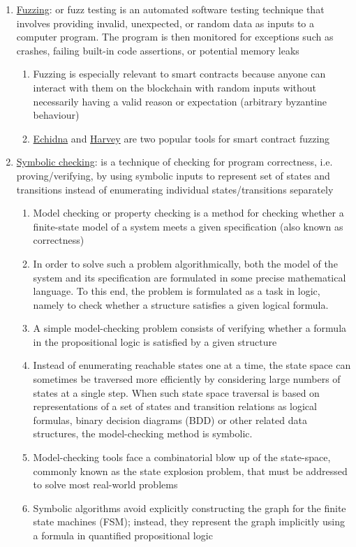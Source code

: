 \begin{enumerate}
\item\href{https://en.wikipedia.org/wiki/Fuzzing}{Fuzzing}: or fuzz testing is an automated software testing technique that involves providing invalid, unexpected, or random data as inputs to a computer program. The program is then monitored for exceptions such as crashes, failing built-in code assertions, or potential memory leaks
	\begin{enumerate}
	\item Fuzzing is especially relevant to smart contracts because anyone can interact with them on the blockchain with random inputs without necessarily having a valid reason or expectation (arbitrary byzantine behaviour)
	\item\href{https://github.com/crytic/echidna}{Echidna} and \href{https://mariachris.github.io/Pubs/FSE-2020-Harvey.pdf}{Harvey} are two popular tools for smart contract fuzzing
	\end{enumerate}

\item\href{https://en.wikipedia.org/wiki/Model\_checking\#Symbolic\_model\_checking}{Symbolic checking}: is a technique of checking for program correctness, i.e. proving/verifying, by using symbolic inputs to represent set of states and transitions instead of enumerating individual states/transitions separately
	\begin{enumerate}
	\item Model checking or property checking is a method for checking whether a finite-state model of a system meets a given specification (also known as correctness)
	\item In order to solve such a problem algorithmically, both the model of the system and its specification are formulated in some precise mathematical language. To this end, the problem is formulated as a task in logic, namely to check whether a structure satisfies a given logical formula.
	\item A simple model-checking problem consists of verifying whether a formula in the propositional logic is satisfied by a given structure
	\item Instead of enumerating reachable states one at a time, the state space can sometimes be traversed more efficiently by considering large numbers of states at a single step. When such state space traversal is based on representations of a set of states and transition relations as logical formulas, binary decision diagrams (BDD) or other related data structures, the model-checking method is symbolic.
	\item Model-checking tools face a combinatorial blow up of the state-space, commonly known as the state explosion problem, that must be addressed to solve most real-world problems
	\item Symbolic algorithms avoid explicitly constructing the graph for the finite state machines (FSM); instead, they represent the graph implicitly using a formula in quantified propositional logic
	\end{enumerate}


\end{enumerate}
